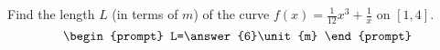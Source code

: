 \documentclass{ximera}
\author{Gregory Hartman \and Matthew Carr}
\begin{document}
\begin{exercise}





Find the length $L$ (in terms of $\unit{m}$) of the curve $f(x)=\frac{1}{12}x^{3}+\frac{1}{x}$ on $[1,4]$.
\[
\begin{prompt}
L=\answer{6}\unit{m}
\end{prompt}
\]




\end{exercise}
\end{document}
